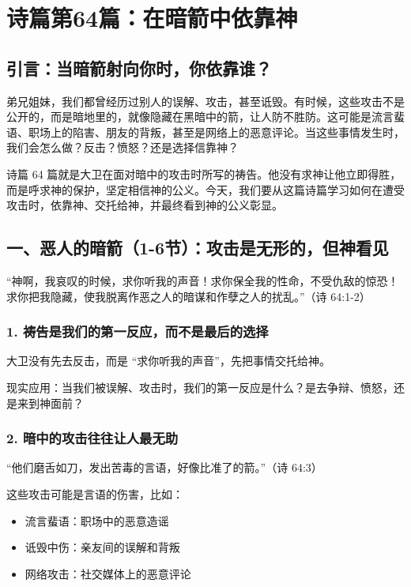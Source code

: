 \documentclass[a4paper, 12pt]{article}
\begin{document}
\section{诗篇第64篇：在暗箭中依靠神}
\subsection*{引言：当暗箭射向你时，你依靠谁？}
\hspace{0.6cm}弟兄姐妹，我们都曾经历过别人的误解、攻击，甚至诋毁。有时候，这些攻击不是公开的，而是暗地里的，就像隐藏在黑暗中的箭，让人防不胜防。这可能是流言蜚语、职场上的陷害、朋友的背叛，甚至是网络上的恶意评论。当这些事情发生时，我们会怎么做？反击？愤怒？还是选择信靠神？

诗篇 64 篇就是大卫在面对暗中的攻击时所写的祷告。他没有求神让他立即得胜，而是呼求神的保护，坚定相信神的公义。今天，我们要从这篇诗篇学习如何在遭受攻击时，依靠神、交托给神，并最终看到神的公义彰显。

\subsection*{一、恶人的暗箭（1-6节）：攻击是无形的，但神看见}
“神啊，我哀叹的时候，求你听我的声音！求你保全我的性命，不受仇敌的惊恐！求你把我隐藏，使我脱离作恶之人的暗谋和作孽之人的扰乱。”（诗 64:1-2）

\subsubsection*{1. 祷告是我们的第一反应，而不是最后的选择}
\hspace{0.6cm}大卫没有先去反击，而是 “求你听我的声音”，先把事情交托给神。

现实应用：当我们被误解、攻击时，我们的第一反应是什么？是去争辩、愤怒，还是来到神面前？
\subsubsection*{2. 暗中的攻击往往让人最无助}
“他们磨舌如刀，发出苦毒的言语，好像比准了的箭。”（诗 64:3）

这些攻击可能是言语的伤害，比如：
\begin{itemize}
    \item 流言蜚语：职场中的恶意造谣

    \item 诋毁中伤：亲友间的误解和背叛

    \item 网络攻击：社交媒体上的恶意评论

\end{itemize}
\end{document}
